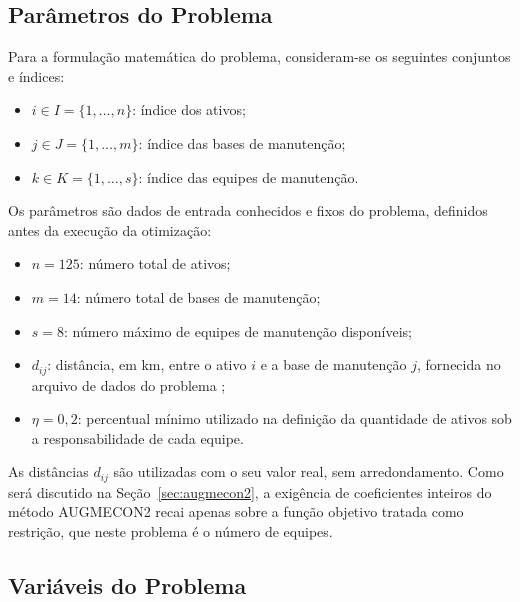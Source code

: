 \documentclass[conference]{IEEEtran}
\begin{document}
\subsection{Parâmetros do Problema}

Para a formulação matemática do problema, consideram-se os seguintes conjuntos e índices:
\begin{itemize}
  \item $i \in I = \{1,\dots,n\}$: índice dos ativos;
  \item $j \in J = \{1,\dots,m\}$: índice das bases de manutenção;
  \item $k \in K = \{1,\dots,s\}$: índice das equipes de manutenção.
\end{itemize}

Os parâmetros são dados de entrada conhecidos e fixos do problema, definidos antes da execução da otimização:
\begin{itemize}
  \item $n = 125$: número total de ativos;
  \item $m = 14$: número total de bases de manutenção;
  \item $s = 8$: número máximo de equipes de manutenção disponíveis;
  \item $d_{ij}$: distância, em km, entre o ativo $i$ e a base de manutenção $j$, fornecida no arquivo de dados do problema \cite{batista_tc};
  \item $\eta = 0{,}2$: percentual mínimo utilizado na definição da quantidade de ativos sob a responsabilidade de cada equipe.
\end{itemize}

As distâncias $d_{ij}$ são utilizadas com o seu valor real, sem arredondamento. Como será discutido na Seção~\ref{sec:augmecon2}, a exigência de coeficientes inteiros do método AUGMECON2 recai apenas sobre a função objetivo tratada como restrição, que neste problema é o número de equipes.

\subsection{Variáveis do Problema}
\end{document}
